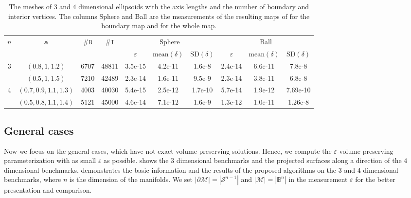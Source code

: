 \documentclass{article}
\begin{document}
\begin{table}[h]
    \centering
    \begin{tabular}{c|c|cc|ccc|ccc}
    \hline
        \multirow{2}{*}{$n$} & \multirow{2}{*}{$\mathbf{a}$} & \multirow{2}{*}{$\# \mathtt{B}$} & \multirow{2}{*}{$\# \mathtt{I}$} & \multicolumn{3}{c|}{Sphere} & \multicolumn{3}{c}{Ball} \\ \cline{5-10}
         & && & $\varepsilon$ & $\text{mean}(\delta)$ & $\text{SD}(\delta)$ & $\varepsilon$ & $\text{mean}(\delta)$ & $\text{SD}(\delta)$\\
    \hline
        \multirow{2}{*}{$3$} & $(0.8,1,1.2)$ & 6707 & 48811 & 3.5e-15 & 4.2e-11 & 1.6e-8 & 2.4e-14 & 6.6e-11 & 7.8e-8 \\
        & $(0.5,1,1.5)$ & 7210 & 42489 & 2.3e-14 & 1.6e-11 & 9.5e-9 & 2.3e-14 & 3.8e-11 & 6.8e-8 \\
    \hline
        \multirow{2}{*}{$4$} & $(0.7,0.9,1.1,1.3)$ & 4003 & 40030 & 5.4e-15 & 2.5e-12 & 1.7e-10 & 5.7e-14 & 1.9e-12 & 7.69e-10 \\
        & $(0.5,0.8,1.1,1.4)$ & 5121 & 45000 & 4.6e-14 & 7.1e-12 & 1.6e-9 & 1.3e-12 & 1.0e-11 & 1.26e-8\\
    \hline
    \end{tabular}
    \caption{The meshes of $3$ and $4$ dimensional ellipsoids with the axis lengths and the number of boundary and interior vertices. The columns Sphere and Ball are the measurements of the resulting maps of  for the boundary map and  for the whole map.}
    \label{tab:ellip}
\end{table}

\subsection{General cases}
Now we focus on the general cases, which have not exact volume-preserving solutions. Hence, we compute the $\varepsilon$-volume-preserving parameterization with as small $\varepsilon$ as possible.  shows the $3$ dimensional benchmarks and the projected surfaces along a direction of the $4$ dimensional benchmarks.  demonstrates the basic information and the results of the proposed algorithms on the $3$ and $4$ dimensional benchmarks, where $n$ is the dimension of the manifolds. We set $|\partial \mathcal{M}| = |\mathcal{S}^{n-1}|$ and $|\mathcal{M}| = |\mathbb{B}^{n}|$ in the measurement $\varepsilon$ for the better presentation and comparison.
\end{document}
